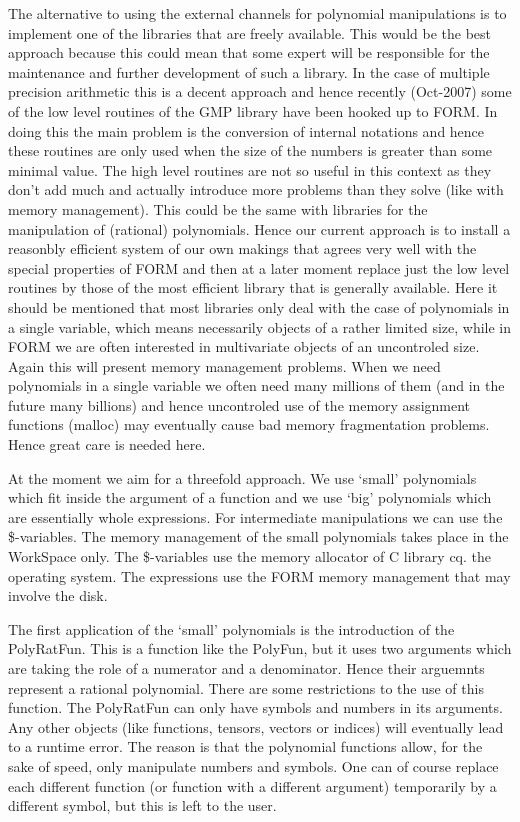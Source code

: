The alternative to using the external channels for polynomial manipulations 
is to implement one of the libraries that are freely available. This would 
be the best approach because this could mean that some expert will be 
responsible for the maintenance and further development of such a library. 
In the case of multiple precision arithmetic this is a decent approach and 
hence recently (Oct-2007) some of the low level routines of the GMP library 
have been hooked up to FORM. In doing this the main problem is the 
conversion of internal notations and hence these routines are only used 
when the size of the numbers is greater than some minimal value. The high 
level routines are not so useful in this context as they don't add much and 
actually introduce more problems than they solve (like with memory 
management). This could be the same with libraries for the manipulation of 
(rational) polynomials. Hence our current approach is to install a 
reasonbly efficient system of our own makings that agrees very well with 
the special properties of FORM and then at a later moment replace just the 
low level routines by those of the most efficient library that is generally 
available. Here it should be mentioned that most libraries only deal with 
the case of polynomials in a single variable, which means necessarily 
objects of a rather limited size, while in FORM we are often interested in 
multivariate objects of an uncontroled size. Again this will present memory 
management problems. When we need polynomials in a single variable we often 
need many millions of them (and in the future many billions) and hence 
uncontroled use of the memory assignment functions (malloc) may eventually 
cause bad memory fragmentation problems. Hence great care is needed here.

At the moment we aim for a threefold approach. We use `small' polynomials 
which fit inside the argument of a function and we use `big' polynomials 
which are essentially whole expressions. For intermediate manipulations we 
can use the \$-variables. The memory management of the small polynomials 
takes place in the WorkSpace only. The \$-variables use the memory 
allocator of C library cq. the operating system. The expressions use the 
FORM memory management that may involve the disk.

The first application of the `small' polynomials is the introduction of the 
PolyRatFun. This is a function like the PolyFun, but it uses two arguments 
which are taking the role of a numerator and a denominator. Hence their 
arguemnts represent a rational polynomial. There are some restrictions to 
the use of this function. The PolyRatFun can only have symbols and numbers 
in its arguments. Any other objects (like functions, tensors, vectors or 
indices) will eventually lead to a runtime error. The reason is that the 
polynomial functions allow, for the sake of speed, only manipulate numbers 
and symbols. One can of course replace each different function (or function 
with a different argument) temporarily by a different symbol, but this is 
left to the user.

